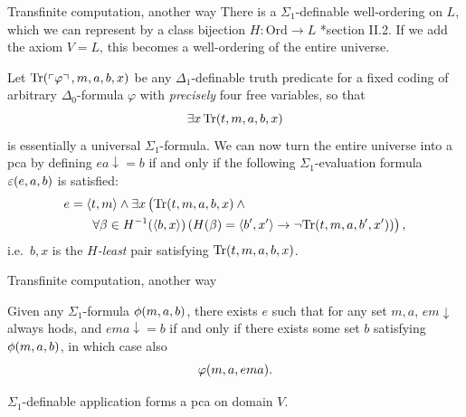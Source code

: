 \documentclass{beamer}
\newcommand{\tuple}[1]{\left\langle #1 \right\rangle}
\begin{document}
\begin{frame}{Transfinite computation, another way}
  There is a $\Sigma_1$-definable well-ordering on $L$, which we can represent by a class bijection $H : \mathrm{Ord} \rightarrow L$ \cite{devlin84-constructibility}*{section II.2}. If we add the axiom $V = L$, this becomes a well-ordering of the entire universe.

  \vspace{0.6em}

  Let $\mathrm{Tr}\mleft(\left\ulcorner  \varphi \right\urcorner, m, a, b, x\mright)$ be any $\Delta_1$-definable truth predicate for a fixed coding of arbitrary $\Delta_0$-formula $\varphi$ with \emph{precisely} four free variables, so that
  \[\exists x \, \mathrm{Tr}\mleft(t, m, a, b, x\mright)\]
  is essentially a universal $\Sigma_1$-formula. We can now turn the entire universe into a pca by defining $ea {\downarrow} = b$ if and only if the following $\Sigma_1$-evaluation formula $\varepsilon\mleft(e, a, b\mright)$ is satisfied:
  \begin{align*}
     & e = \tuple{t, m} \land \exists x \left(\mathrm{Tr}\mleft(t, m, a, b, x\mright) \land \phantom{H^{-1}}\right.                                                                            \\
     & \qquad \left.\forall \beta \in H^{-1}\mleft(\tuple{b, x}\mright) \left(H\mleft(\beta\mright) = \tuple{b', x'} \rightarrow \neg \mathrm{Tr}\mleft(t, m, a, b', x'\mright)\right)\right),
  \end{align*}
  i.e.\ $b, x$ is the \emph{$H$-least} pair satisfying $\mathrm{Tr}\mleft(t, m, a, b, x\mright)$.
\end{frame}

\begin{frame}{Transfinite computation, another way}
  \begin{lemma}
    Given any $\Sigma_1$-formula $\phi\mleft(m, a, b\mright)$, there exists $e$ such that for any set $m, a$, $em {\downarrow}$ always hods, and $ema {\downarrow} = b$ if and only if there exists some set $b$ satisfying $\phi\mleft(m, a, b\mright)$, in which case also
    \[\varphi\mleft(m, a, ema\mright).\]
  \end{lemma}

  \vspace{1em}

  \begin{theorem}[$\mathrm{KP}^- + \Sigma_1\text{-}\mathrm{SI} + V = L$]
    $\Sigma_1$-definable application forms a pca on domain $V$.
  \end{theorem}
\end{frame}
\end{document}
